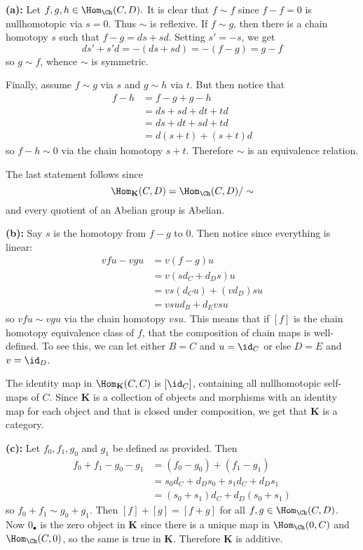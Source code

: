\documentclass[12pt]{article}
\begin{document}
\begin{sol}
	\textbf{(a):} Let $f,g,h\in\Hom_{\Ch}(C,D).$ It is clear that $f\sim f$ since $f-f=0$ is nullhomotopic via $s=0$. Thus $\sim$ is reflexive.
	If $f\sim g$, then there is a chain homotopy $s$ such that $f-g=ds+sd$. Setting $s'=-s$, we get
	\[ds'+s'd=-(ds+sd)=-(f-g)=g-f\]
	so $g\sim f$, whence $\sim$ is symmetric.

	Finally, assume $f\sim g$ via $s$ and $g\sim h$ via $t$. But then notice that
	\begin{align*}
		f-h &= f-g + g-h\\
		&= ds+sd+dt+td\\
		&= ds+dt+sd+td\\
		&= d(s+t)+(s+t)d
	\end{align*}
	so $f-h\sim 0$ via the chain homotopy $s+t$. Therefore $\sim$ is an equivalence relation.

	The last statement follows since 
	\[\Hom_{\mathbf K}(C,D)=\Hom_{\Ch}(C,D)/\sim\]
	and every quotient of an Abelian group is Abelian.

	\vspace{2ex}\noindent \textbf{(b):} Say $s$ is the homotopy from $f-g$ to $0$. Then notice since everything is linear:
	\begin{align*}
		vfu-vgu &= v(f-g)u\\
		&= v(sd_C+d_Ds)u\\
		&= vs(d_Cu)+(vd_D)su\\
		&= vsud_B+d_Evsu
	\end{align*}
	so $vfu\sim vgu$ via the chain homotopy $vsu$. This means that if $[f]$ is the chain homotopy
	equivalence class of $f$, that the composition of chain maps is well-defined. To see this, we can let
	either $B=C$ and $u=\id_C$ or else $D=E$ and $v=\id_D$. 
	
	The identity map in $\Hom_{\mathbf K}(C,C)$ is $[\id_C]$, containing all nullhomotopic self-maps of $C$.
	Since $\mathbf K$ is a collection of objects and morphisms with an identity map for each object and that is closed 
	under composition, we get that $\mathbf K$ is a category.

	\vspace{2ex}\noindent \textbf{(c):} Let $f_0,f_1,g_0$ and $g_1$ be defined as provided. Then
	\begin{align*}
		f_0+f_1-g_0-g_1 &= (f_0-g_0)+(f_1-g_1)\\
		&= s_0d_C+d_Ds_0 +s_1d_C+d_D s_1\\
		&= (s_0+s_1)d_C+d_D(s_0+s_1)
	\end{align*}
	so $f_0+f_1\sim g_0+ g_1$. Then $[f]+[g]=[f+g]$ for all $f,g\in\Hom_{\Ch}(C,D)$. Now $0_\bullet$
	is the zero object in $\mathbf K$ since there is a unique map in $\Hom_{\Ch}(0,C)$ and $\Hom_{\Ch}(C,0)$,
	so the same is true in $\mathbf K$. Therefore $\mathbf K$ is additive.


\end{sol}
\end{document}
